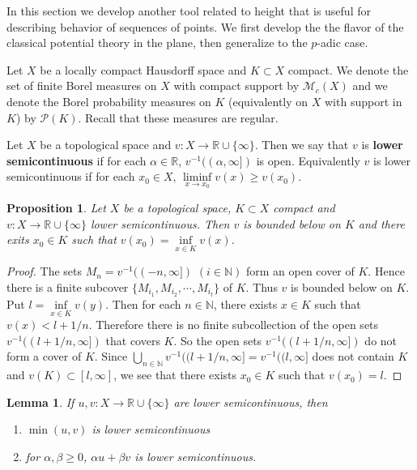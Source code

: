 \documentclass{amsart}
\newtheorem{lem}[thm]{Lemma}
\newtheorem{prop}[thm]{Proposition}
\newcommand{\R}{\mathbb{R}}
\newcommand{\N}{\mathbb{N}}
\newcommand{\MCM}{\mathcal{M}}
\begin{document}
In this section we develop another tool related to height that is useful for describing behavior of sequences of points. We first develop the the flavor of the classical potential theory in the plane, then generalize to the $p$-adic case.

Let $X$ be a locally compact Hausdorff space and $K \subset X$ compact. We denote the set of finite Borel measures on $X$ with compact support by $\MCM_c(X)$ and we denote the Borel probability measures on $K$ (equivalently on $X$ with support in $K$) by $\mathcal{P}(K)$. Recall that these measures are regular.

Let $X$ be a topological space and $v:X \rightarrow \R\cup \{ \infty \}$. Then we say that $v$ is \textbf{lower semicontinuous} if for each $\alpha \in \R$, $v^{-1}((\alpha,\infty])$ is open. Equivalently $v$ is lower semicontinuous if for each $x_0 \in X$, $\liminf\limits_{x \rightarrow x_0}v(x) \geq v(x_0)$.

\begin{prop}

Let $X$ be a topological space, $K \subset X$ compact and $v:X \rightarrow \R\cup \{ \infty \}$ lower semicontinuous. Then $v$ is bounded below on $K$ and there exits $x_0 \in K$ such that $v(x_0) = \inf\limits_{x \in K}v(x)$.

\end{prop}

\begin{proof}

The sets $M_n = v^{-1}((-n,\infty])$ $(i \in \N)$ form an open cover of $K$. Hence there is a finite subcover $\{M_{i_1}, M_{i_2}, \cdots, M_{i_t}\}$ of $K$. Thus $v$ is bounded below on $K$. Put $l = \inf\limits_{x \in K}v(y)$. Then for each $n \in \N$, there exists $x \in K$ such that $v(x) < l+1/n$. Therefore there is no finite subcollection of the open sets $v^{-1}((l+1/n,\infty])$ that covers $K$. So the open sets $v^{-1}((l+1/n,\infty])$ do not form a cover of $K$. Since $\bigcup\limits_{n \in \N}v^{-1}((l+1/n,\infty] = v^{-1}((l,\infty]$ does not contain $K$ and $v(K) \subset [l, \infty]$, we see that there exists $x_0 \in K$ such that $v(x_0) = l$. 

\end{proof}

\begin{lem}

If $u,v:X \rightarrow \R\cup \{\infty\}$ are lower semicontinuous, then 

\begin{enumerate}
\item $\min(u,v)$ is lower semicontinuous
\item for $\alpha, \beta \geq 0$, $\alpha u + \beta v$ is lower semicontinuous.
\end{enumerate} 

\end{lem}
\end{document}
